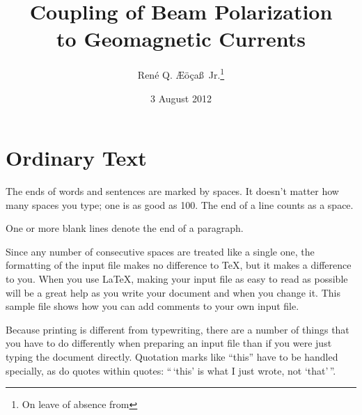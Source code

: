 \documentclass{cernatsreport}    %
\title{Coupling of Beam Polarization  \\ %
       to Geomagnetic Currents}         %
\author{Ren\'e Q. \AE\"o\c ca\ss\ Jr.\thanks{On leave of absence from
                                             }
       }            %
\date{3 August 2012}  %
\begin{document}



\maketitle                 %

     \tableofcontents
     \listoffigures
     \listoftables
     \newpage


\section{Ordinary Text}        %

The ends  of words and sentences are marked
  by   spaces. It  doesn't matter how many
spaces    you type; one is as good as 100.  The
end of   a line counts as a space.

One   or more   blank lines denote the  end
of  a paragraph.

Since any number of consecutive spaces are treated like a single
one, the formatting of the input file makes no difference to
      \TeX,         %
but it makes a difference to you.
When you use
      \LaTeX,       %
making your input file as easy to read as possible
will be a great help as you write your document and when you
change it.  This sample file shows how you can add comments to
your own input file.

Because printing is different from typewriting, there are a
number of things that you have to do differently when preparing
an input file than if you were just typing the document directly.
Quotation marks like
       ``this''
have to be handled specially, as do quotes within quotes:
       ``\,`this'             %
        is what I just
        wrote, not  `that'\,''.
\end{document}
